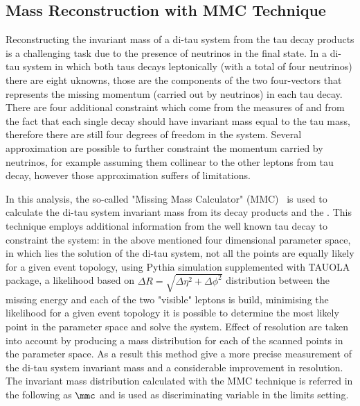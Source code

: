 \subsection{Mass Reconstruction with MMC Technique}\label{sec:mmc}

Reconstructing the invariant mass of a di-tau system from the tau decay products is a challenging task
due to the presence of neutrinos in the final state. 
In a di-tau system in which both taus decays leptonically (with a total of four neutrinos) there are eight uknowns, those are the components of the two 
four-vectors that represents the missing momentum (carried out by neutrinos) in each tau decay. There are four additional constraint 
which come from the measures of \MET and from the fact that each single decay should have invariant mass equal to the tau mass,
therefore there are still four degrees of freedom in the system.
Several approximation are possible to further constraint the momentum carried by neutrinos,
for example assuming them collinear to the other leptons from tau decay, however those approximation suffers of limitations. 

In this analysis, the so-called "Missing Mass Calculator" (MMC)~\cite{MMC}
is used to calculate the di-tau system invariant mass from its decay products and the \met. This technique employs additional 
information from the well known tau decay to constraint the system:
in the above mentioned four dimensional parameter space, in which lies the solution of the di-tau system, not all the points are 
equally likely for a given event topology, using Pythia simulation supplemented with TAUOLA package,
a likelihood based on $\Delta R  =  \sqrt{\Delta\eta^2 + \Delta\phi^2}$ distribution between the missing energy and each of the two "visible" leptons is build, 
minimising the likelihood for a given event topology it is possible to determine the most likely point in the parameter space
and solve the system. Effect of resolution are taken into account by producing a mass distribution
for each of the scanned points in the parameter space. As a result this method give a more precise measurement of the di-tau
system invariant mass and a considerable improvement in resolution. The invariant mass distribution 
calculated with the MMC technique is referred in the following as $\mmc$ and is used as discriminating 
variable in the limits setting.


 

